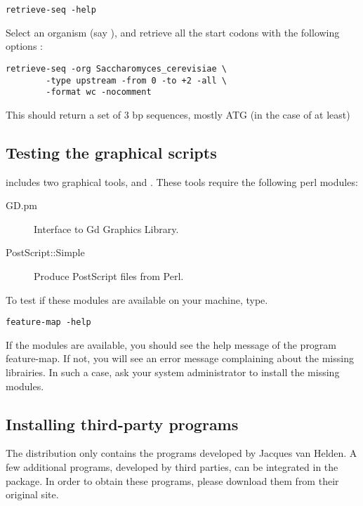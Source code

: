 \documentclass{article}
\begin{document}
\begin{verbatim}
retrieve-seq -help
\end{verbatim}

Select an organism (say ), and
retrieve all the start codons with the following options :

\begin{verbatim}
retrieve-seq -org Saccharomyces_cerevisiae \
        -type upstream -from 0 -to +2 -all \
        -format wc -nocomment 
\end{verbatim}

This should return a set of 3 bp sequences, mostly ATG (in the case of
 at least)

\subsection{Testing the graphical scripts}

\RSAT includes two graphical tools,  and
. These tools require the following  perl modules: 

\begin{description}
\item[GD.pm] Interface to Gd Graphics Library.
\item[PostScript::Simple]  Produce PostScript files from Perl.
\end{description}

To test if these modules are available on your machine, type.

\begin{verbatim}
feature-map -help
\end{verbatim}

If the modules are available, you should see the help message of the
program feature-map. If not, you will see an error message complaining
about the missing librairies. In such a case, ask your system
administrator to install the missing modules.

\subsection{Installing third-party programs}

The \RSAT distribution only contains the programs developed by Jacques
van Helden. A few additional programs, developed by third parties, can
be integrated in the package. In order to obtain these programs,
please download them from their original site.
\end{document}
